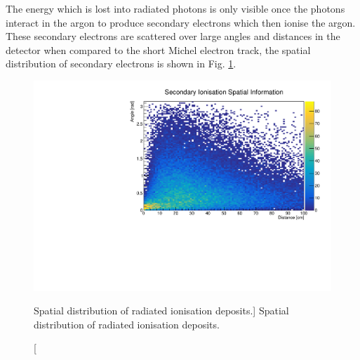 The energy which is lost into radiated photons is only visible once the photons
interact in the argon to produce secondary electrons which then ionise the
argon. These secondary electrons are scattered over large angles and distances
in the detector when compared to the short Michel electron track, the spatial 
distribution of secondary electrons is shown in Fig. \ref{fig:photon_geom}.
\begin{figure}
	\centering
	\includegraphics[width=\textwidth]{figures/photon_geom.pdf}
	\caption
	[Spatial distribution of radiated ionisation deposits.]
	{Spatial distribution of radiated ionisation deposits.}
	\label{fig:photon_geom}
\end{figure}

